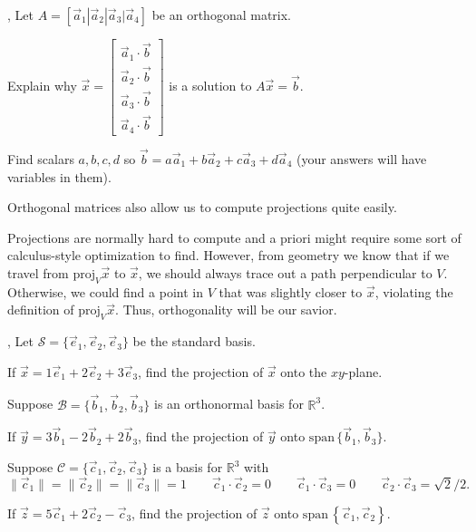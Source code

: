 \documentclass[letter]{article}
\newcommand{\R}{\mathbb{R}}
\newcommand{\proj}{\mathrm{proj}}
\renewcommand{\span}{\mathrm{span}\,}
\newcommand{\mat}[1]{\begin{bmatrix}#1\end{bmatrix}}
\renewcommand{\emph}[1]{{\color{defcolor} \textbf{\textit{##1}}}}
\begin{document}
	\sep
	Let $A=[\vec a_1|\vec a_2|\vec a_3|\vec a_4]$ be an orthogonal matrix.
	\begin{Enum}
		\item Explain why 
			$\vec x=\mat{\vec a_1\cdot \vec b\\
				     \vec a_2\cdot \vec b\\
			     	     \vec a_3\cdot \vec b\\
			     	     \vec a_4\cdot \vec b}$ is a solution to $A\vec x=\vec b$.
		\item Find scalars $a,b,c,d$ so $\vec b=a\vec a_1+b\vec a_2+c\vec a_3+d\vec a_4$
			(your answers will have variables in them).
	\end{Enum}

	Orthogonal matrices also allow us to compute projections quite easily.


	Projections are normally hard to compute and a priori might require some sort
	of calculus-style optimization to find.  However, from geometry we know that 
	if we travel from $\proj_V \vec x$ to $\vec x$, we should always trace out a path
	perpendicular to $V$.  Otherwise, we could find a point in $V$ that was slightly closer
	to $\vec x$, violating the definition of $\proj_V \vec x$.  Thus, orthogonality
	will be our savior.

	\sep
	Let $\mathcal S=\{\vec e_1,\vec e_2,\vec e_3\}$ be the standard basis.
	\begin{Enum}
		\item If $\vec x=1\vec e_1+2\vec e_2+3\vec e_3$, find the projection of $\vec x$
			onto the $xy$-plane.
	\end{Enum}
	Suppose $\mathcal B=\{\vec b_1,\vec b_2,\vec b_3\}$ is an orthonormal basis for $\R^3$.
	\begin{Enum}[resume]
		\item If $\vec y=3\vec b_1-2\vec b_2+2\vec b_3$, find the projection of $\vec y$
			onto $\span\{\vec b_1,\vec b_3\}$.
	\end{Enum}
	Suppose $\mathcal C=\{\vec c_1,\vec c_2,\vec c_3\}$ is a basis for $\R^3$ with
	\[
		\|\vec c_1\| = 
		\|\vec c_2\| = 
		\|\vec c_3\| = 1\qquad \vec c_1\cdot \vec c_2=0\qquad \vec c_1\cdot \vec c_3=0
		\qquad \vec c_2\cdot \vec c_3=\sqrt{2}/2.
	\]
	\vspace{-.35in}
	\begin{Enum}[resume]
		\item If $\vec z=5\vec c_1+2\vec c_2-\vec c_3$, find the projection of $\vec z$
			onto $\span\left\{\vec c_1,\vec c_2\right\}$.
	\end{Enum}
\end{document}
